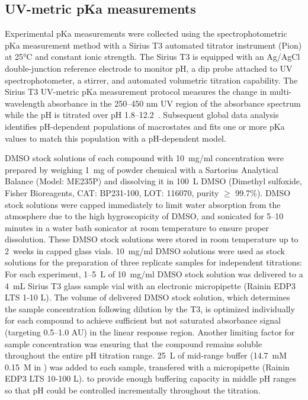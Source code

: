 \documentclass[9pt,lineno]{elife}
\begin{document}
\subsection{UV-metric pKa measurements}

Experimental pKa measurements were collected using the spectrophotometric pKa measurement method with a Sirius T3 automated titrator instrument (Pion) at 25°C and constant ionic strength. 
The Sirius T3 is equipped with an Ag/AgCl double-junction reference electrode to monitor pH, a dip probe attached to UV spectrophotometer, a stirrer, and automated volumetric titration capability. 
The Sirius T3 UV-metric pKa measurement protocol measures the change in multi-wavelength absorbance in the 250--450 nm UV region of the absorbance spectrum while the pH is titrated over pH 1.8--12.2~\citep{tam_multi-wavelength_2001, allen_multiwavelength_1998}. 
Subsequent global data analysis identifies pH-dependent populations of macrostates and fits one or more pKa values to match this population with a pH-dependent model.

DMSO stock solutions of each compound with 10~mg/ml concentration were prepared by weighing 1~mg of powder chemical with a Sartorius Analytical Balance (Model: ME235P) and dissolving it in 100~{\micro}L DMSO (Dimethyl sulfoxide, Fisher Bioreagents, CAT: BP231-100, LOT: 116070, purity $\geq$ 99.7\%).  
DMSO stock solutions were capped immediately to limit water absorption from the atmosphere due to the high hygroscopicity of DMSO, and sonicated for 5--10 minutes in a water bath sonicator at room temperature to ensure proper dissolution. 
These DMSO stock solutions were stored in room temperature up to 2~weeks in capped glass vials. 
10~mg/ml DMSO solutions were used as stock solutions for the preparation of three replicate samples for independent titrations:  For each experiment, 1--5~{\micro}L of 10~mg/ml DMSO stock solution was delivered to a 4~mL Sirius T3 glass sample vial with an electronic micropipette (Rainin EDP3 LTS 1-10 \micro L). 
The volume of delivered DMSO stock solution, which determines the sample concentration following dilution by the T3, is optimized individually for each compound to achieve sufficient but not saturated absorbance signal (targeting 0.5--1.0 AU) in the linear response region. 
Another limiting factor for sample concentration was ensuring that the compound remains soluble throughout the entire pH titration range. 
25~{\micro}L of mid-range buffer (14.7~mM  0.15~M  in ) was added to each sample, transfered with a micropipette (Rainin EDP3 LTS 10-100 \micro L). to provide enough buffering capacity in middle pH ranges so that pH could be controlled incrementally throughout the titration.  
\end{document}
